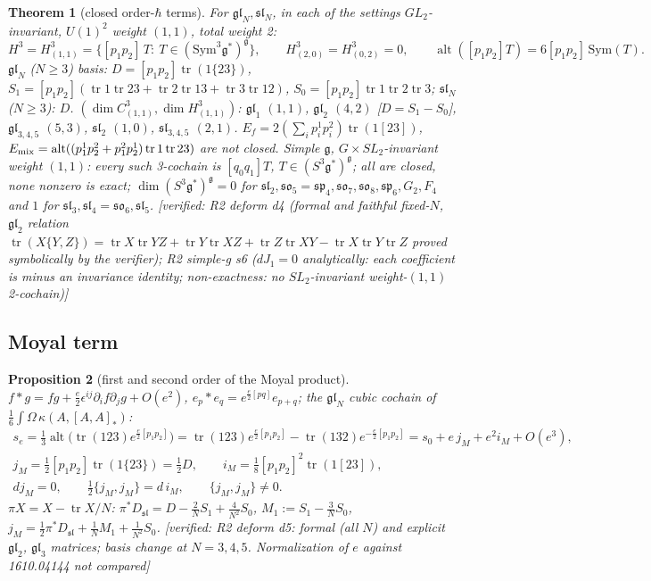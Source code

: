 \documentclass[10pt,a4paper]{article}
\numberwithin{equation}{section}
\newtheorem{theorem}{Theorem}[section]
\newtheorem{proposition}[theorem]{Proposition}
\theoremstyle{definition}
\theoremstyle{remark}
\newcommand{\tr}{\operatorname{tr}}
\newcommand{\alt}{\operatorname{alt}}
\newcommand{\g}{\mathfrak g}
\newcommand{\fsl}{\mathfrak{sl}}
\newcommand{\fgl}{\mathfrak{gl}}
\newcommand{\fso}{\mathfrak{so}}
\newcommand{\fsp}{\mathfrak{sp}}
\newcommand{\ver}[1]{\textup{[verified: #1]}}
\begin{document}
\begin{theorem}[closed order-$\hbar$ terms]\label{thm-H3}
For $\fgl_N,\fsl_N$, in each of the settings $GL_2$-invariant, $U(1)^2$ weight $(1,1)$, total weight 2:
\begin{equation}
H^3=H^3_{(1,1)}=\{[p_1p_2]\,T:\ T\in(\mathrm{Sym}^3\g^*)^\g\},\qquad H^3_{(2,0)}=H^3_{(0,2)}=0,\qquad \alt([p_1p_2]T)=6[p_1p_2]\,\mathrm{Sym}(T).
\end{equation}
$\fgl_N$ ($N\ge3$) basis: $D=[p_1p_2]\tr(1\{23\})$, $S_1=[p_1p_2](\tr1\tr23+\tr2\tr13+\tr3\tr12)$, $S_0=[p_1p_2]\tr1\tr2\tr3$; $\fsl_N$ ($N\ge3$): $D$. $(\dim C^3_{(1,1)},\dim H^3_{(1,1)})$: $\fgl_1$ $(1,1)$, $\fgl_2$ $(4,2)$ [$D=S_1-S_0$], $\fgl_{3,4,5}$ $(5,3)$, $\fsl_2$ $(1,0)$, $\fsl_{3,4,5}$ $(2,1)$. $E_f=2(\sum_ip^1_ip^2_i)\tr(1[23])$, $E_{\rm mix}=\alt((p^1_1p^2_2+p^2_1p^1_2)\tr1\tr23)$ are not closed.
Simple $\g$, $G\times SL_2$-invariant weight $(1,1)$: every such 3-cochain is $[q_0q_1]T$, $T\in(S^3\g^*)^\g$; all are closed, none nonzero is exact; $\dim(S^3\g^*)^\g=0$ for $\fsl_2,\fso_5=\fsp_4,\fso_7,\fso_8,\fsp_6,G_2,F_4$ and $1$ for $\fsl_3,\fsl_4=\fso_6,\fsl_5$.
\ver{R2 deform d4 (formal and faithful fixed-$N$, $\fgl_2$ relation $\tr(X\{Y,Z\})=\tr X\tr YZ+\tr Y\tr XZ+\tr Z\tr XY-\tr X\tr Y\tr Z$ proved symbolically by the verifier); R2 simple-g s6 ($dJ_1=0$ analytically: each coefficient is minus an invariance identity; non-exactness: no $SL_2$-invariant weight-$(1,1)$ 2-cochain)}
\end{theorem}

\subsection{Moyal term}

\begin{proposition}[first and second order of the Moyal product]\label{prop-moyal}
$f*g=fg+\frac e2\epsilon^{ij}\partial_if\partial_jg+O(e^2)$, $e_p*e_q=e^{\frac e2[pq]}e_{p+q}$; the $\fgl_N$ cubic cochain of $\frac16\int\Omega\,\kappa(A,[A,A]_*)$:
\begin{gather}
s_e=\tfrac13\alt\big(\tr(123)e^{\frac e2[p_1p_2]}\big)=\tr(123)e^{\frac e2[p_1p_2]}-\tr(132)e^{-\frac e2[p_1p_2]}=s_0+e\,j_M+e^2i_M+O(e^3),\\
j_M=\tfrac12[p_1p_2]\tr(1\{23\})=\tfrac12D,\qquad i_M=\tfrac18[p_1p_2]^2\tr(1[23]),\\
dj_M=0,\qquad \tfrac12\{j_M,j_M\}=d\,i_M,\qquad\{j_M,j_M\}\ne0 .
\end{gather}
$\pi X=X-\tr X/N$: $\pi^*D_{\fsl}=D-\frac2NS_1+\frac4{N^2}S_0$, $M_1:=S_1-\frac3NS_0$, $j_M=\frac12\pi^*D_{\fsl}+\frac1NM_1+\frac1{N^2}S_0$.
\ver{R2 deform d5: formal (all $N$) and explicit $\fgl_2$, $\fgl_3$ matrices; basis change at $N=3,4,5$. Normalization of $e$ against 1610.04144 not compared}
\end{proposition}
\end{document}
